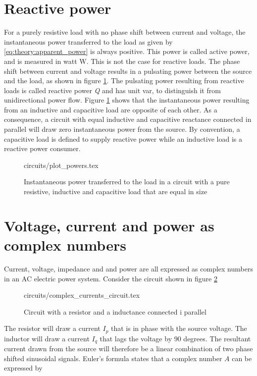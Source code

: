 \documentclass[class=book, crop=false]{standalone}
\begin{document}
\section{Reactive power}
For a purely resistive load with no phase shift between current and voltage, the instantaneous power transferred to the load as given by \eqref{eq:theory:apparent_power} is always positive. This power is called active power, and is measured in watt W. This is not the case for reactive loads. The phase shift between current and voltage results in a pulsating power between the source and the load, as shown in figure \ref{fig:theory:reactive_powers}. The pulsating power resulting from reactive loads is called reactive power \textit{Q} and has unit var, to distinguish it from unidirectional power flow. Figure \ref{fig:theory:reactive_powers} shows that the instantaneous power resulting from an inductive and capacitive load are opposite of each other. As a consequence, a circuit with equal inductive and capacitive reactance connected in parallel will draw zero instantaneous power from the source. By convention, a capacitive load is defined to supply reactive power while an inductive load is a reactive power consumer. 

\begin{figure}[ht!]
    \center
    {circuits/plot_powers.tex}
    \caption[size = 9]
    {Instantaneous power transferred to the load in a circuit with a pure resistive, inductive and capacitive load that are equal in size}\label{fig:theory:reactive_powers}
\end{figure}


\section{Voltage, current and power as complex numbers}

Current, voltage, impedance and and power are all expressed as complex numbers in an AC electric power system. Consider the circuit shown in figure \ref{fig:theory:complex_current_circuit}
\begin{figure}[ht!]
    \center
    {circuits/complex_currents_circuit.tex}
    \caption[size = 9]
    {Circuit with a resistor and a inductance connected i parallel}\label{fig:theory:complex_current_circuit}
\end{figure}
The resistor will draw a current $I_{p}$ that is in phase with the source voltage. The inductor will draw a current $I_{q}$ that lags the voltage by 90 degrees. The resultant current drawn from the source will therefore be a linear combination of two phase shifted sinusoidal signals. Euler's formula states that a complex number $A$ can be expressed by
\end{document}
